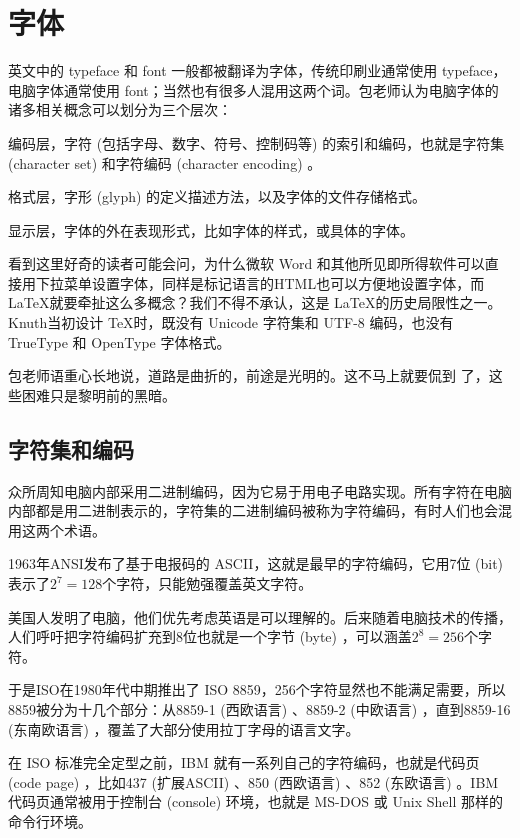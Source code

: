 \chapter{字体}

英文中的 typeface 和 font 一般都被翻译为字体，传统印刷业通常使用 typeface，电脑字体通常使用 font；当然也有很多人混用这两个词。包老师认为电脑字体的诸多相关概念可以划分为三个层次：

\begin{compactenum}
  \item 编码层，字符 (包括字母、数字、符号、控制码等) 的索引和编码，也就是字符集 (character set) 和字符编码 (character encoding) 。
  \item 格式层，字形 (glyph) 的定义描述方法，以及字体的文件存储格式。
  \item 显示层，字体的外在表现形式，比如字体的样式，或具体的字体。
\end{compactenum}

看到这里好奇的读者可能会问，为什么微软\indexMSFT{} Word 和其他所见即所得软件可以直接用下拉菜单设置字体，同样是标记语言的HTML也可以方便地设置字体，而 \LaTeX 就要牵扯这么多概念？我们不得不承认，这是 \LaTeX 的历史局限性之一。Knuth\indexKnuth 当初设计 \TeX 时，既没有 Unicode 字符集和 UTF-8 编码，也没有 TrueType 和 OpenType 字体格式。

包老师语重心长地说，道路是曲折的，前途是光明的。这不马上就要侃到 \XeTeX 了，这些困难只是黎明前的黑暗。

\section{字符集和编码}
\label{sec:encoding}

众所周知电脑内部采用二进制编码，因为它易于用电子电路实现。所有字符在电脑内部都是用二进制表示的，字符集的二进制编码被称为字符编码，有时人们也会混用这两个术语。

1963年ANSI\indexANSI 发布了基于电报码的 ASCII，这就是最早的字符编码，它用7位 (bit) 表示了$2^7=128$个字符，只能勉强覆盖英文字符。

美国人发明了电脑，他们优先考虑英语是可以理解的。后来随着电脑技术的传播，人们呼吁把字符编码扩充到8位也就是一个字节 (byte) ，可以涵盖$2^8=256$个字符。

于是ISO\indexISO 在1980年代中期推出了 ISO 8859，256个字符显然也不能满足需要，所以8859被分为十几个部分：从8859-1 (西欧语言) 、8859-2 (中欧语言) ，直到8859-16 (东南欧语言) ，覆盖了大部分使用拉丁字母的语言文字。

在 ISO 标准完全定型之前，IBM 就有一系列自己的字符编码，也就是代码页 (code page) ，比如437 (扩展ASCII) 、850 (西欧语言) 、852 (东欧语言) 。IBM\indexIBM 代码页通常被用于控制台 (console) 环境，也就是 MS-DOS 或 Unix Shell 那样的命令行环境。

